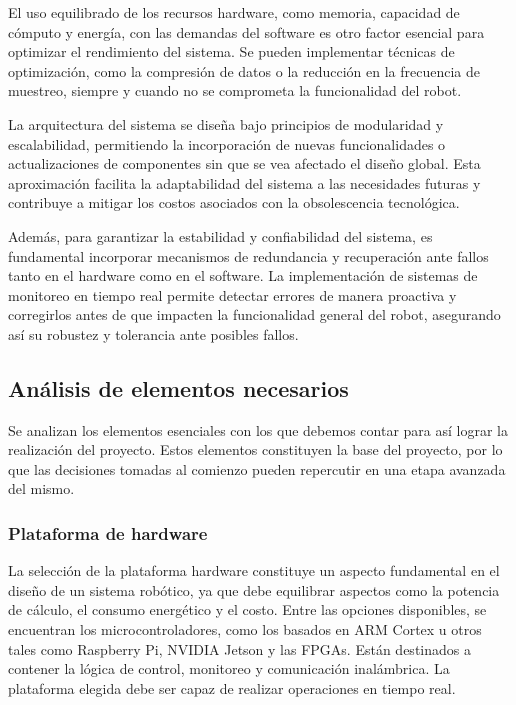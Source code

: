 El uso equilibrado de los recursos hardware, como memoria, capacidad de cómputo y energía, con las demandas del software es otro factor esencial para optimizar el rendimiento del sistema. Se pueden implementar técnicas de optimización, como la compresión de datos o la reducción en la frecuencia de muestreo, siempre y cuando no se comprometa la funcionalidad del robot.

La arquitectura del sistema se diseña bajo principios de modularidad y escalabilidad, permitiendo la incorporación de nuevas funcionalidades o actualizaciones de componentes sin que se vea afectado el diseño global. Esta aproximación facilita la adaptabilidad del sistema a las necesidades futuras y contribuye a mitigar los costos asociados con la obsolescencia tecnológica.

Además, para garantizar la estabilidad y confiabilidad del sistema, es fundamental incorporar mecanismos de redundancia y recuperación ante fallos tanto en el hardware como en el software. La implementación de sistemas de monitoreo en tiempo real permite detectar errores de manera proactiva y corregirlos antes de que impacten la funcionalidad general del robot, asegurando así su robustez y tolerancia ante posibles fallos.


\subsection{Análisis de elementos necesarios}

Se analizan los elementos esenciales con los que debemos contar para así lograr la realización del proyecto. Estos elementos constituyen la base del proyecto, por lo que las decisiones tomadas al comienzo pueden repercutir en una etapa avanzada del mismo.


\subsubsection{Plataforma de hardware}

La selección de la plataforma hardware constituye un aspecto fundamental en el diseño de un sistema robótico, ya que debe equilibrar aspectos como la potencia de cálculo, el consumo energético y el costo. Entre las opciones disponibles, se encuentran los microcontroladores, como los basados en ARM Cortex u otros tales como Raspberry Pi, NVIDIA Jetson y las FPGAs. Están destinados a contener la lógica de control, monitoreo y comunicación inalámbrica. La plataforma elegida debe ser capaz de realizar operaciones en tiempo real. \cite{oshanartos}

